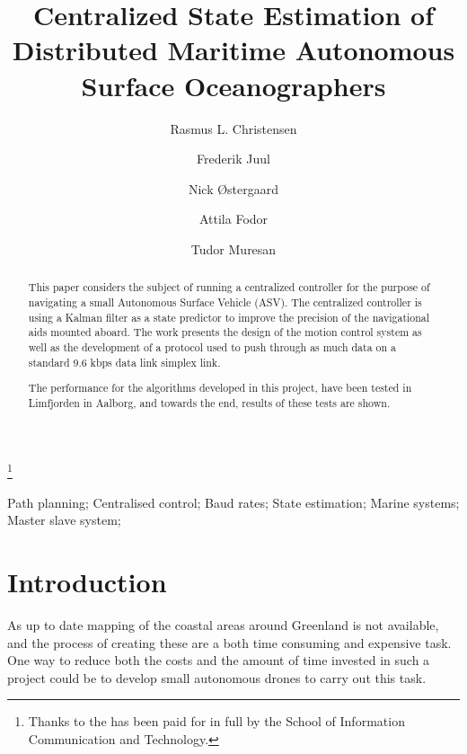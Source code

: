 \documentclass{ifacconf}
\begin{document}
\begin{frontmatter}

\title{Centralized State Estimation of Distributed Maritime Autonomous Surface Oceanographers} %

\thanks[footnoteinfo]{Thanks to the  has been paid for in full by the School of Information Communication and Technology.}

\author[First]{Rasmus L. Christensen} 
\author[First]{Frederik Juul} 
\author[First]{Nick \O stergaard}
\author[First]{Attila Fodor}
\author[First]{Tudor Muresan}
\address[First]{Department of Electronic Systems, Aalborg University, Fredrik Bajers Vej 7, 9220 Aalborg \O st, Denmark (e-mail: \{ralch,nickoe,fjuul,tudor,attila\}@es.aau.dk)}                                            
          
\begin{keyword}                           %
Path planning; Centralised control; Baud rates; State estimation; Marine systems; Master slave system;              %
\end{keyword}                             %


\begin{abstract}                          %
This paper considers the subject of running a centralized controller for the purpose of navigating a small Autonomous Surface Vehicle (ASV). The centralized controller is using a Kalman filter as a state predictor to improve the precision of the navigational aids mounted aboard. The work presents the design of the motion control system as well as the development of a protocol used to push through as much data on a standard 9.6 kbps data link simplex link.

The performance for the algorithms developed in this project, have been tested in Limfjorden in Aalborg, and towards the end, results of these tests are shown. 
\end{abstract}

\end{frontmatter}

\section{Introduction}
As up to date mapping of the coastal areas around Greenland is not available, and the process of creating these are a both time consuming and expensive task. One way to reduce both the costs and the amount of time invested in such a project could be to develop small autonomous drones to carry out this task. 
\end{document}

